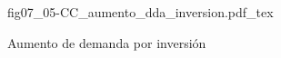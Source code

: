 \begin{figure}[h]
\centering
\def\svgwidth{0.5\textwidth}
{fig07_05-CC_aumento_dda_inversion.pdf_tex}
\caption{Aumento de demanda por inversión}
\label{fig07_05-CC_aumento_dda_inversion}
\end{figure}